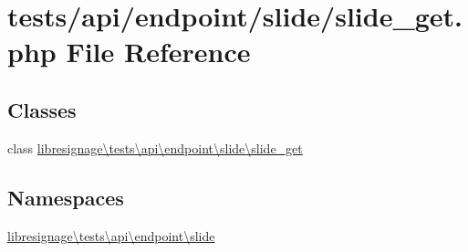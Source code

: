 \hypertarget{tests_2api_2endpoint_2slide_2slide__get_8php}{}\section{tests/api/endpoint/slide/slide\+\_\+get.php File Reference}
\label{tests_2api_2endpoint_2slide_2slide__get_8php}
\subsection*{Classes}
\begin{DoxyCompactItemize}
\item 
class \hyperlink{classlibresignage_1_1tests_1_1api_1_1endpoint_1_1slide_1_1slide__get}{libresignage\textbackslash{}tests\textbackslash{}api\textbackslash{}endpoint\textbackslash{}slide\textbackslash{}slide\+\_\+get}
\end{DoxyCompactItemize}
\subsection*{Namespaces}
\begin{DoxyCompactItemize}
\item 
 \hyperlink{namespacelibresignage_1_1tests_1_1api_1_1endpoint_1_1slide}{libresignage\textbackslash{}tests\textbackslash{}api\textbackslash{}endpoint\textbackslash{}slide}
\end{DoxyCompactItemize}
